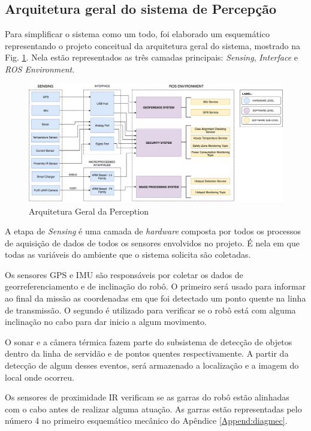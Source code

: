 \subsection{Arquitetura geral do sistema de Percepção}
\label{ssec:arqg}

Para simplificar o sistema como um todo, foi elaborado um esquemático representando o projeto conceitual da arquitetura geral do sistema, mostrado na Fig. \ref{arqgeral}. Nela estão representados as três camadas principais: \textit{Sensing}, \textit{Interface} e \textit{ROS Environment}.

\begin{figure}[!ht]
\centering
\includegraphics[width=15cm]{Figures/ArquiteturaPerceptionv2.png}
\caption{Arquitetura Geral da Perception}\label{arqgeral}
\end{figure}

 A etapa de \textit{Sensing} é uma camada de \textit{hardware} composta por todos os processos de aquisição de dados de todos os sensores envolvidos no projeto. É nela em que todas as variáveis do ambiente que o sistema solicita são coletadas.
 
Os sensores GPS e IMU são responsáveis por coletar os dados de georreferenciamento e de inclinação do robô. O primeiro será usado para informar ao final da missão as coordenadas em que foi detectado um ponto quente na linha de transmissão. O segundo é utilizado para verificar se o robô está com alguma inclinação no cabo para dar inicio a algum movimento.

O sonar e a câmera térmica fazem parte do subsistema de detecção de objetos dentro da linha de servidão e de pontos quentes respectivamente. A partir da detecção de algum desses eventos, será armazenado a localização e a imagem do local onde ocorreu. 

Os sensores de proximidade IR verificam se as garras do robô estão alinhadas com o cabo antes de realizar alguma atuação. As garras estão representadas pelo número 4 no primeiro esquemático mecânico do Apêndice \ref{Append:diagmec}.


